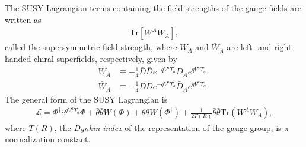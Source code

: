 \documentclass[twoside,english]{uiofysmaster}
\begin{document}
The SUSY Lagrangian terms containing the field strengths of the gauge fields are written as
\begin{align}
	\mathrm{Tr}[W^A W_A],
\end{align}
called the supersymmetric field strength, where $W_A$ and $\bar W_{\dot A}$ are left- and right-handed chiral superfields, respectively, given by
\begin{align}
	W_A &\equiv -\frac{1}{4}\bar D\bar D e^{-qV^aT_a} D_A e^{qV^a T_a},\\
	\bar W_{\dot A} &\equiv -\frac{1}{4} D D e^{-qV^aT_a} \bar D_{\dot A} e^{qV^a T_a}.
\end{align}
The general form of the SUSY Lagrangian is
\begin{align}
	\mathcal{L} = \Phi^\dag e^{qV^a T_a}\Phi + \bar\theta\bar\theta W(\Phi) + \theta\theta W(\Phi^\dag) + \frac{1}{2T(R)}\bar\theta\bar\theta \mathrm{Tr}(W^A W_A),
\end{align}
where $T(R)$, the {\it Dynkin index} of the representation of the gauge group, is a normalization constant.
\end{document}
